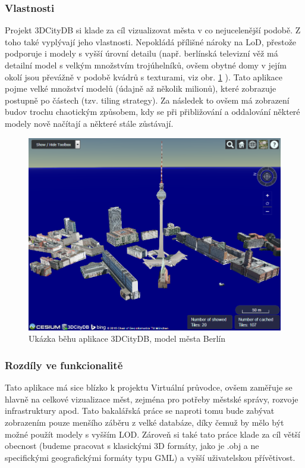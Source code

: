 \documentclass[thesis=B,czech]{FITthesis}[2012/06/26]
\begin{document}
        \subsubsection{Vlastnosti}
        
        Projekt 3DCityDB si klade za cíl vizualizovat města v co nejucelenější podobě. Z toho také vyplývají jeho vlastnosti. Nepokládá přílišné nároky na LoD, přestože podporuje i modely s vyšší úrovní detailu (např. berlínská televizní věž má detailní model s velkým množstvím trojúhelníků, ovšem obytné domy v jejím okolí jsou převážně v podobě kvádrů s texturami, viz obr. \ref{fig:3DcityDB} ). Tato aplikace pojme velké množství modelů (údajně až několik milionů), které zobrazuje postupně po částech (tzv. tiling strategy). Za následek to ovšem má zobrazení budov trochu chaotickým způsobem, kdy se při přibližování a oddalování některé modely nově načítají a některé stále zůstávají.\cite{3DCityDB}
        
        \begin{figure}
  		\includegraphics[width=\textwidth,height=\textheight,keepaspectratio]{3dcitydb.png}
  		\caption{Ukázka běhu aplikace 3DCityDB, model města Berlín}
  		\label{fig:3DcityDB}
	\end{figure}
        
        \subsubsection{Rozdíly ve funkcionalitě}
        
        Tato aplikace má sice blízko k projektu Virtuální průvodce, ovšem zaměřuje se hlavně na celkové vizualizace měst, zejména pro potřeby městské správy, rozvoje infrastruktury apod. Tato bakalářská práce se naproti tomu bude zabývat zobrazením pouze menšího záběru z velké databáze, díky čemuž by mělo být možné použít modely s vyšším LOD. Zároveň si také tato práce klade za cíl větší obecnost (budeme pracovat s klasickými 3D formáty, jako je .obj a ne specifickými geografickými formáty typu GML) a vyšší uživatelskou přívětivost.
\end{document}
